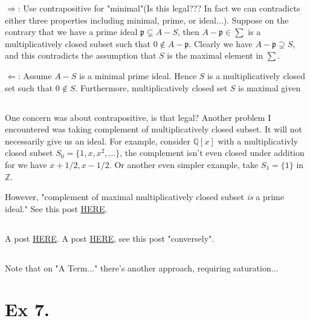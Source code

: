 $\Rightarrow$: Use contrapositive for "minimal"(Is this legal??? In fact we can contradicts either three properties including minimal, prime, or ideal...). Suppose on the contrary that we have a prime ideal $\mathfrak p\subsetneq A-S$, then $A-\mathfrak p\in \sum$ is a multiplicatively closed subset such that $0\notin A-\mathfrak p$. Clearly we have $A-\mathfrak p\supsetneq S$, and this contradicts the assumption that $S$ is the maximal element in $\sum$.

$\Leftarrow$: Assume $A-S$ is a minimal prime ideal. Hence $S$ is a multiplicatively closed set such that $0\notin S$. Furthermore, multiplicatively closed set $S$ is maximal given

\subsection{}
One concern was about contrapositive, is that legal? Another problem I encountered was taking complement of multiplicatively closed subset. It will not necessarily give us an ideal. For example, consider $\mathbb Q[x]$ with a multiplicativly closed subset $S_0=\{1,x,x^2,...\}$, the complement isn't even closed under addition for we have $x+1/2,x-1/2$. Or another even simpler example, take $S_1=\{1\}$ in $\mathbb Z$.

However, "complement of maximal multiplicatively closed subset \textit{is} a prime ideal." See this post \href{https://math.stackexchange.com/questions/3704318/complement-of-multiplicative-set-is-a-prime-ideal}{HERE}. 

\subsection{}
A post \href{https://math.stackexchange.com/questions/25739/complement-of-maximal-multiplicative-set-is-a-prime-ideal}{HERE}. A post \href{https://math.stackexchange.com/questions/3962023/atiyah-macdonald-exercise-3-6}{HERE}, see this post "conversely". 

\subsection{}

Note that on "A Term..." there's another approach, requiring saturation... 

\section{Ex 7.}\label{Atiyah Chapter 3 Ex 7}

